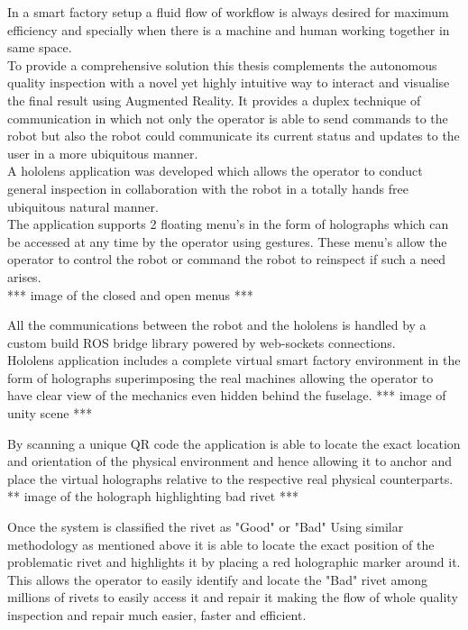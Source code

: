 \documentclass{article}
\begin{document}
In a smart factory setup a fluid flow of workflow is always desired for maximum efficiency and specially when there is a machine and human working together in  same space.\\

To provide a comprehensive solution this thesis complements the autonomous quality inspection with a  novel yet highly intuitive way to interact and visualise the final result using Augmented Reality. It provides a duplex technique of communication in which not only the operator is able to send commands to the robot but also the robot could communicate its current status and updates to the user in a more ubiquitous manner.\\

A hololens application was developed which allows the operator to conduct general inspection in collaboration with the robot in a totally hands free ubiquitous natural manner.\\

The application supports 2 floating menu's in the form of holographs which can be accessed at any time by the operator using gestures. These menu's allow the operator to control the robot or command the robot to reinspect if such a need arises.\\ 

*** image of the closed and open menus ***

All the communications between the robot and the hololens is handled by a custom build ROS bridge library powered by web-sockets connections.\\

Hololens application includes a complete virtual smart factory environment in the form of holographs
superimposing the real machines allowing the operator to have clear view of the mechanics even hidden behind the fuselage. *** image of unity scene *** 


By scanning a unique QR code the application is able to locate the exact location and orientation of the physical environment and hence allowing it to anchor and place the virtual holographs relative to the respective real physical counterparts.\\

** image of the holograph highlighting bad rivet ***

Once the system is classified the rivet as "Good" or "Bad" Using similar methodology as mentioned above it is able to locate the exact position of the problematic rivet and highlights it by placing a red holographic marker around it. This allows the operator to easily identify and locate the "Bad" rivet among millions of rivets to easily access it and repair it making the flow of whole quality inspection and repair much easier, faster and efficient.  
\end{document}
